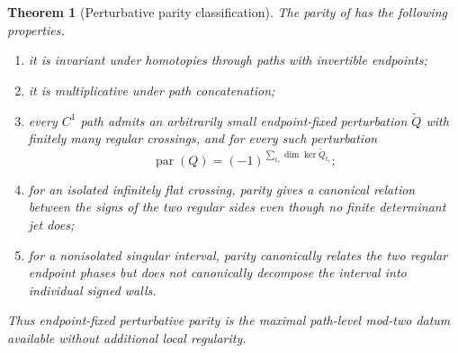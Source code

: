 \documentclass[11pt]{article}
\newtheorem{theorem}{Theorem}[section]
\theoremstyle{definition}
\theoremstyle{remark}
\begin{document}
\begin{theorem}[Perturbative parity classification]
\label{thm:determinant-path-parity}
The parity of  has the following properties.
\begin{enumerate}[label=\textup{(\roman*)},leftmargin=2.4em]
\item it is invariant under homotopies through paths with invertible
      endpoints;
\item it is multiplicative under path concatenation;
\item every \(C^1\) path admits an arbitrarily small endpoint-fixed
      perturbation \(\widetilde Q\) with finitely many regular crossings, and
      for every such perturbation
      \[
       \boxed{
       \operatorname{par}(Q)
       =
       (-1)^{\sum_{t_*}\dim\ker\widetilde Q_{t_*}};}
      \]
\item for an isolated infinitely flat crossing, parity gives a canonical
      relation between the signs of the two regular sides even though no
      finite determinant jet does;
\item for a nonisolated singular interval, parity canonically relates the two
      regular endpoint phases but does not canonically decompose the interval
      into individual signed walls.
\end{enumerate}
Thus endpoint-fixed perturbative parity is the maximal path-level
mod-two datum available without additional local regularity.
\end{theorem}
\end{document}
